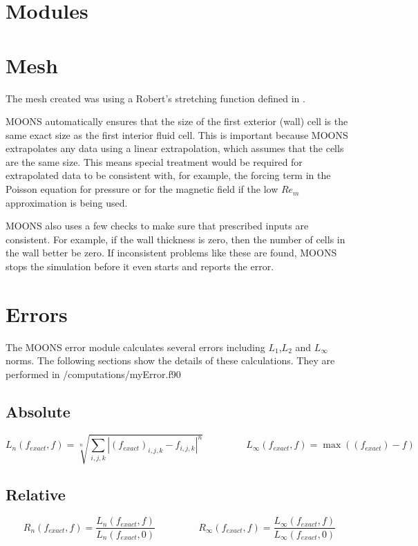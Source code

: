 \documentclass[11pt]{article}
\newcommand{\eqtab}{\;\;\;\;\;\;\;\;\;\;\;\;\;\;\;\;}
\newcommand{\Rem}{$Re_m$}
\begin{document}
\section{Modules}

\section{Mesh}
The mesh created was using a Robert's stretching function defined in \cite{pletcher2012computational}. 

MOONS automatically ensures that the size of the first exterior (wall) cell is the same exact size as the first interior fluid cell. This is important because MOONS extrapolates any data using a linear extrapolation, which assumes that the cells are the same size. This means special treatment would be required for extrapolated data to be consistent with, for example, the forcing term in the Poisson equation for pressure or for the magnetic field if the low \Rem approximation is being used.

MOONS also uses a few checks to make sure that prescribed inputs are consistent. For example, if the wall thickness is zero, then the number of cells in the wall better be zero. If inconsistent problems like these are found, MOONS stops the simulation before it even starts and reports the error.

\section{Errors}
The MOONS error module calculates several errors including $L_1$,$L_2$ and $L_{\infty}$ norms. The following sections show the details of these calculations. They are performed in /computations/myError.f90

\subsection{Absolute}
\begin{equation}
L_n(f_{exact},f) =  \sqrt[n]{\sum_{i,j,k} |(f_{exact})_{i,j,k} - f_{i,j,k}|^n} \eqtab
L_\infty(f_{exact},f) = \max( (f_{exact}) - f )
\end{equation}

\subsection{Relative}
\begin{equation}
R_{n}(f_{exact},f) = \frac{L_n(f_{exact},f)}{L_n(f_{exact},0)} \eqtab
R_{\infty}(f_{exact},f) = \frac{L_\infty(f_{exact},f)}{L_\infty(f_{exact},0)}
\end{equation}
\end{document}
